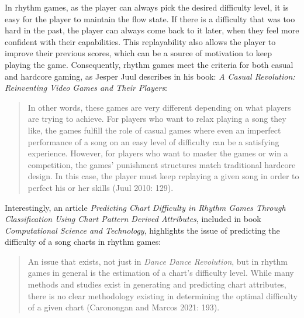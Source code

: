 In rhythm games, as the player can always pick the desired difficulty level, it is easy for the player to maintain the flow state. If there is a difficulty that was too hard in the past, the player can always come back to it later, when they feel more confident with their capabilities. This replayability also allows the player to improve their previous scores, which can be a source of motivation to keep playing the game. Consequently, rhythm games meet the criteria for both casual and hardcore gaming, as Jesper Juul describes in his book: \textit{A Casual Revolution: Reinventing Video Games and Their Players}\cite{casualrevolution}:
\begin{quote}
    In other words, these games are very different depending on what players are trying to achieve. For players who want to relax playing a song they like, the games fulfill the role of casual games where even an imperfect performance of a song on an easy level of difficulty can be a satisfying experience. However, for players who want to master the games or win a competition, the games’ punishment structures match traditional hardcore design. In this case, the player must keep replaying a given song in order to perfect his or her skills (Juul 2010: 129).
\end{quote}

Interestingly, an article \textit{Predicting Chart Difficulty in Rhythm Games Through Classification Using Chart Pattern Derived Attributes}, included in book \textit{Computational Science and Technology}, highlights the issue of predicting the difficulty of a song charts in rhythm games: 
\begin{quote}
    An issue that exists, not just in \textit{Dance Dance Revolution}, but in rhythm games in general is the estimation of a chart’s difficulty level. While many methods and studies exist in generating and predicting chart attributes, there is no clear methodology existing in determining the optimal difficulty of a given chart (Caronongan and Marcos 2021: 193).
\end{quote}
 
